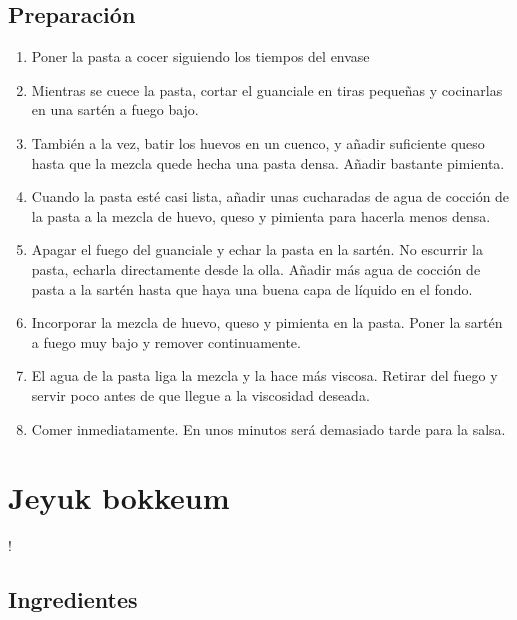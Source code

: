 \documentclass[
]{book}
\providecommand{\tightlist}{%
  \setlength{\itemsep}{0pt}\setlength{\parskip}{0pt}}
\begin{document}
\hypertarget{preparaciuxf3n-1}{%
\section*{Preparación}\label{preparaciuxf3n-1}}

\begin{enumerate}
\def\labelenumi{\arabic{enumi}.}
\tightlist
\item
  Poner la pasta a cocer siguiendo los tiempos del envase
\item
  Mientras se cuece la pasta, cortar el guanciale en tiras pequeñas y cocinarlas en una sartén a fuego bajo.
\item
  También a la vez, batir los huevos en un cuenco, y añadir suficiente queso hasta que la mezcla quede hecha una pasta densa. Añadir bastante pimienta.
\item
  Cuando la pasta esté casi lista, añadir unas cucharadas de agua de cocción de la pasta a la mezcla de huevo, queso y pimienta para hacerla menos densa.
\item
  Apagar el fuego del guanciale y echar la pasta en la sartén. No escurrir la pasta, echarla directamente desde la olla. Añadir más agua de cocción de pasta a la sartén hasta que haya una buena capa de líquido en el fondo.
\item
  Incorporar la mezcla de huevo, queso y pimienta en la pasta. Poner la sartén a fuego muy bajo y remover continuamente.
\item
  El agua de la pasta liga la mezcla y la hace más viscosa. Retirar del fuego y servir poco antes de que llegue a la viscosidad deseada.
\item
  Comer inmediatamente. En unos minutos será demasiado tarde para la salsa.
\end{enumerate}

\hypertarget{jeyuk-bokkeum}{%
\chapter{Jeyuk bokkeum}\label{jeyuk-bokkeum}}

!

\hypertarget{ingredientes-2}{%
\section*{Ingredientes}\label{ingredientes-2}}
\end{document}

